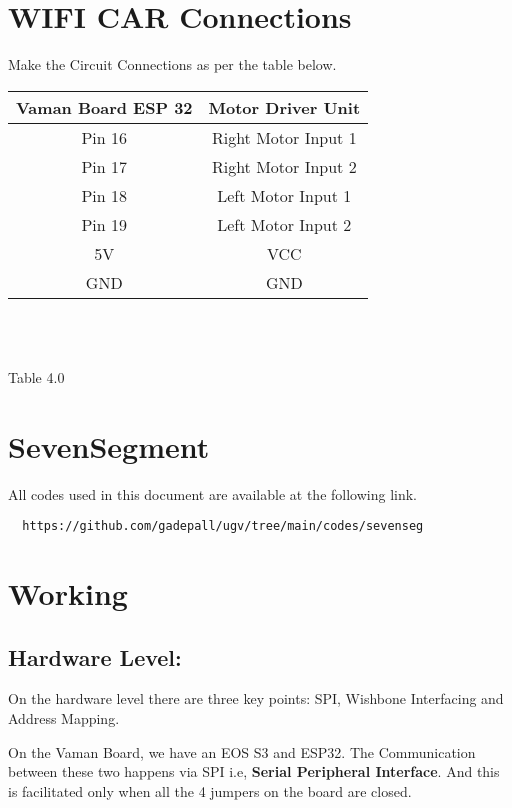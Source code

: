 \documentclass[journal,12pt,twocolumn]{IEEEtran}
\begin{document}
\section{WIFI CAR Connections}
\raggedright
Make the Circuit Connections as per the table below.\\
\vspace{0.25cm}
\centering
\begin{tabular}{|c|c|}
\hline
Vaman Board ESP 32 & Motor Driver Unit\\
\hline
Pin 16 & Right Motor Input 1\\
\hline
Pin 17 & Right Motor Input 2\\
\hline
Pin 18 & Left Motor Input 1\\
\hline
Pin 19 & Left Motor Input 2\\
\hline
5V & VCC\\
\hline
GND & GND\\
\hline
\end{tabular}\\
\
\centerline{Table 4.0}
\section{SevenSegment}
All codes used in this document are available at the following link.
\begin{lstlisting}
  https://github.com/gadepall/ugv/tree/main/codes/sevenseg
\end{lstlisting}

\section{Working}

\raggedright
\subsection{Hardware Level: }

On the hardware level there are three key points: SPI, Wishbone Interfacing and Address Mapping.\\
\vspace{0.2cm}

On the Vaman Board, we have an EOS S3 and ESP32. The Communication between these two happens via SPI i.e, \textbf{Serial Peripheral Interface}. And this is facilitated only when all the 4 jumpers on the board are closed. \\

\vspace{0.25cm}
\end{document}
